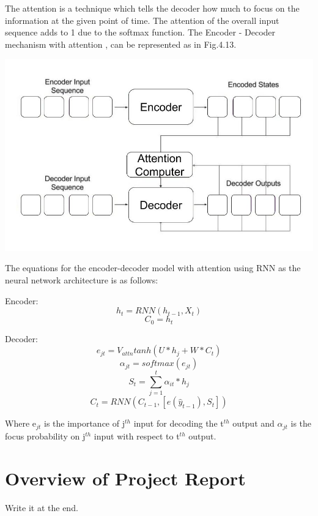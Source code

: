 The attention is a technique which tells the decoder how much to focus on the information at the given point of time. The attention of the overall input sequence adds to 1 due to the softmax function. The Encoder - Decoder mechanism with attention \cite{2}, \cite{7} can be represented as in Fig.4.13.

				\begin{center}
				\includegraphics[width=\linewidth]{figures/Attention-Model.jpg}	
				\label{fig: Encoder - Decoder Mechanism with Attention}
				\end{center}

The equations for the encoder-decoder model with attention using RNN as the neural network architecture is as follows:

Encoder: \begin{equation} h_{t} = RNN(h_{t-1}, X_{t}) \end{equation}
		\begin{equation} C_{0} = h_{t}  \end{equation}

Decoder: \begin{equation} e_{jt} = V_{attn} tanh(U * h_{j} + W * C_{t}) \end{equation}	
		 \begin{equation} \alpha_{jt} = softmax(e_{jt})  \end{equation}
		 \begin{equation} S_{t} = \sum_{j=1}^t\alpha_{it} * h_{j}  \end{equation}  
		 \begin{equation} C_{t} = RNN(C_{t-1}, [e(\hat{y}_{t-1}), S_{t}])  \end{equation} 

Where e$_{jt}$ is the importance of j$^{th}$ input for decoding the t$^{th}$ output and $\alpha$$_{jt}$ is the focus probability on j$^{th}$ input with respect to t$^{th}$ output.
	


\section{Overview of Project Report}

Write it at the end.